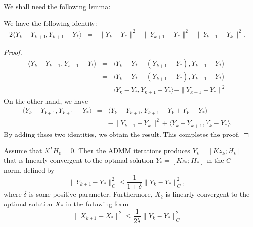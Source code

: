 We shall need the following lemma: 
\begin{lemma}
We have the following identity:
\begin{eqnarray*}
2 \langle Y_{k} - Y_{k+1}, Y_{k+1} - Y_* \rangle &=& \|Y_{k} - Y_*\|^2 - \|Y_{k+1} - Y_* \|^2 - \|Y_{k+1} - Y_k\|^2. 
\end{eqnarray*} 
\end{lemma} 
\begin{proof} 

\begin{eqnarray*}
\langle Y_{k} - Y_{k+1}, Y_{k+1} - Y_* \rangle &=& \langle Y_{k} - Y_* - (Y_{k+1} - Y_*), Y_{k+1} - Y_* \rangle \\ 
&=& \langle Y_{k} - Y_* - (Y_{k+1} - Y_*), Y_{k+1} - Y_* \rangle \\
&=&  \langle Y_{k} - Y_*, Y_{k+1} - Y_* \rangle - \| Y_{k+1} - Y_* \|^2
\end{eqnarray*} 
On the other hand, we have 
\begin{eqnarray*}
\langle Y_{k} - Y_{k+1}, Y_{k+1} - Y_* \rangle &=& \langle Y_{k} - Y_{k+1}, Y_{k+1} - Y_k + Y_k - Y_* \rangle \\ 
&=& - \|Y_{k+1} - Y_{k}\|^2 + \langle Y_{k} - Y_{k+1}, Y_k - Y_* \rangle . 
\end{eqnarray*} 
By adding these two identities, we obtain the result. This completes the proof. 
\end{proof}
\begin{theorem}
Assume that $K^TH_0 = 0$. Then the ADMM iterations produces $Y_k = [Kz_k; H_k]$ that is linearly convergent to the optimal solution  $Y_* = [Kz_*; H_*]$ in the $C$-norm, defined by 
\begin{equation}
\|Y_{k+1} - Y_* \|^2_C \leq \frac{1}{1+\delta} \| Y_{k} - Y_*\|^2_C,
\end{equation}
where $\delta$ is some positive parameter. Furthermore, $X_k$ is linearly convergent to the optimal solution $X_*$ in the following form
\begin{equation}
\|X_{k+1} - X_* \|^2 \leq \frac{1}{2 \lambda} \|Y_{k} - Y_* \|^2_C
\end{equation}
\end{theorem}
